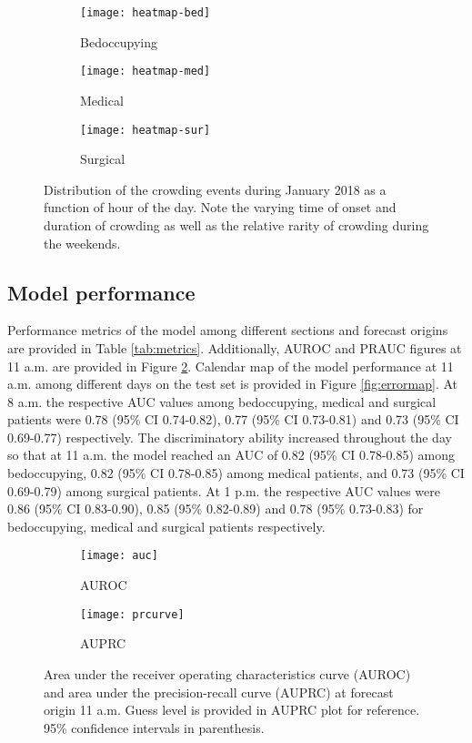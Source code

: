 \begin{figure}[H]
    \centering
        \begin{subfigure}[b]{0.30\textwidth}
            \texttt{[image: heatmap-bed]}
            \caption{Bedoccupying}
        \end{subfigure}
        \begin{subfigure}[b]{0.30\textwidth}
            \texttt{[image: heatmap-med]}
            \caption{Medical}
        \end{subfigure}
        \begin{subfigure}[b]{0.30\textwidth}
            \texttt{[image: heatmap-sur]}
            \caption{Surgical}
        \end{subfigure}
        \caption{Distribution of the crowding events during January 2018 as a function of hour of the day. Note the varying time of onset and duration of crowding as well as the relative rarity of crowding during the weekends.}
        \label{fig:heatmap}
\end{figure}



\subsection{Model performance}

Performance metrics of the model among different sections and forecast origins are provided in Table \ref{tab:metrics}. Additionally, AUROC and PRAUC figures at 11 a.m. are provided in Figure \ref{fig:auroc_and_auprc}. Calendar map of the model performance at 11 a.m. among different days on the test set is provided in Figure \ref{fig:errormap}. At 8 a.m. the respective AUC values among bedoccupying, medical and surgical patients were 0.78 (95\% CI 0.74-0.82), 0.77 (95\% CI 0.73-0.81) and 0.73 (95\% CI 0.69-0.77) respectively. The discriminatory ability increased throughout the day so that at 11 a.m. the model reached an AUC of 0.82 (95\% CI 0.78-0.85) among bedoccupying, 0.82 (95\% CI 0.78-0.85) among medical patients, and 0.73 (95\% CI 0.69-0.79) among surgical patients. At 1 p.m. the respective AUC values were 0.86 (95\% CI 0.83-0.90), 0.85 (95\% 0.82-0.89) and 0.78 (95\% 0.73-0.83) for bedoccupying, medical and surgical patients respectively.

\begin{figure}[H]
    \centering
    \begin{subfigure}[b]{0.35\textwidth}
        \texttt{[image: auc]}
        \caption{AUROC}
    \end{subfigure}
    \begin{subfigure}[b]{0.57\textwidth}
        \texttt{[image: prcurve]}
        \caption{AUPRC}
    \end{subfigure}
    \caption{Area under the receiver operating characteristics curve (AUROC) and area under the precision-recall curve (AUPRC) at forecast origin 11 a.m. Guess level is provided in AUPRC plot for reference. 95\% confidence intervals in parenthesis.}
    \label{fig:auroc_and_auprc}
\end{figure}


